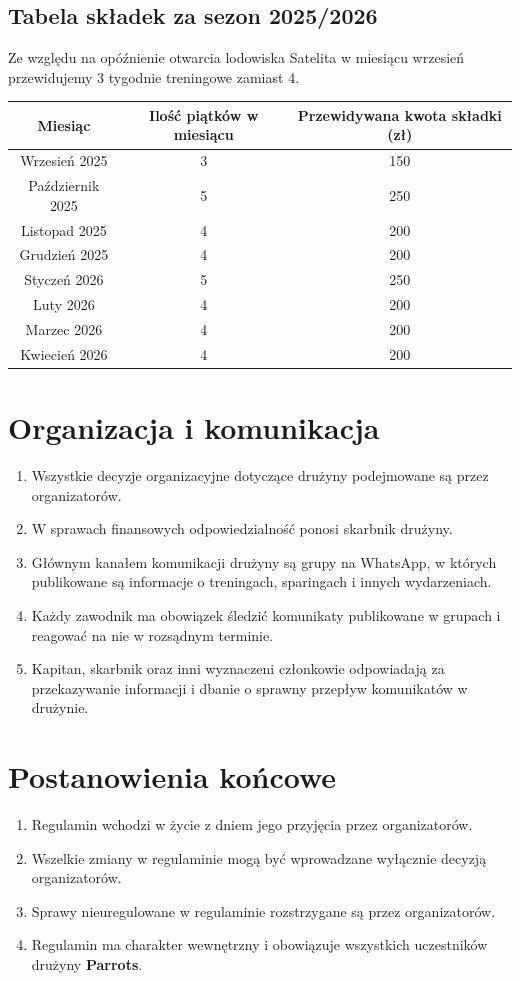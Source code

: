 \documentclass[12pt,a4paper]{article}
\let\stdsection\section
\renewcommand\section{\clearpage\stdsection}
\begin{document}
\subsection{Tabela składek za sezon 2025/2026}
Ze względu na opóźnienie otwarcia lodowiska Satelita w miesiącu wrzesień przewidujemy 3 tygodnie treningowe zamiast 4.
\begin{center}
\begin{tabular}{ |c|c|c| } 
 \hline
 Miesiąc & Ilość piątków w miesiącu & Przewidywana kwota składki (zł) \\ 
 \hline
 Wrzesień 2025 & 3 & 150 \\ 
 Październik 2025 & 5 & 250 \\ 
 Listopad 2025 & 4 & 200 \\ 
 Grudzień 2025 & 4 & 200 \\ 
 Styczeń 2026 & 5 & 250 \\ 
 Luty 2026 & 4 & 200 \\ 
 Marzec 2026 & 4 & 200 \\ 
 Kwiecień 2026 & 4 & 200 \\ 
\hline
\end{tabular}
\end{center}

\section{Organizacja i komunikacja}
\begin{enumerate}
  \item Wszystkie decyzje organizacyjne dotyczące drużyny podejmowane są przez organizatorów.
  \item W sprawach finansowych odpowiedzialność ponosi skarbnik drużyny.
  \item Głównym kanałem komunikacji drużyny są grupy na WhatsApp, w których publikowane są informacje o treningach, sparingach i innych wydarzeniach.
  \item Każdy zawodnik ma obowiązek śledzić komunikaty publikowane w grupach i reagować na nie w rozsądnym terminie.
  \item Kapitan, skarbnik oraz inni wyznaczeni członkowie odpowiadają za przekazywanie informacji i dbanie o sprawny przepływ komunikatów w drużynie.
\end{enumerate}

\section{Postanowienia końcowe}
\begin{enumerate}
  \item Regulamin wchodzi w życie z dniem jego przyjęcia przez organizatorów.
  \item Wszelkie zmiany w regulaminie mogą być wprowadzane wyłącznie decyzją organizatorów.
  \item Sprawy nieuregulowane w regulaminie rozstrzygane są przez organizatorów.
  \item Regulamin ma charakter wewnętrzny i obowiązuje wszystkich uczestników drużyny \textbf{Parrots}.
\end{enumerate}
\end{document}
